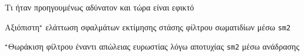 \begin{frame}{Τι ήταν προηγουμένως αδύνατον και τώρα είναι εφικτό}

  Αξιόπιστη$^\star$ ελάττωση σφαλμάτων εκτίμησης στάσης φίλτρου σωματιδίων μέσω \texttt{sm2}

  \vspace{2cm}

  \small $^\star$Θωράκιση φίλτρου έναντι απώλειας ευρωστίας λόγω αποτυχίας \texttt{sm2} μέσω ανάδρασης

\end{frame}
